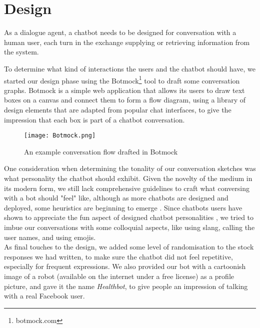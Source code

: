 \section{Design}
As a dialogue agent, a chatbot needs to be designed for conversation with a human user, each turn in the exchange supplying or retrieving information from the system.

To determine what kind of interactions the users and the chatbot should have, we started our design phase using the Botmock\footnote{botmock.com} tool to draft some conversation graphs. Botmock is a simple web application that allows its users to draw text boxes on a canvas and connect them to form a flow diagram, using a library of design elements that are adapted from popular chat interfaces, to give the impression that each box is part of a chatbot conversation.

\begin{figure}[h!]
  \texttt{[image: Botmock.png]}
  \caption{An example conversation flow drafted in Botmock}
\end{figure}
One consideration when determining the tonality of our conversation sketches was what personality the chatbot should exhibit. Given the novelty of the medium in its modern form, we still lack comprehensive guidelines to craft what conversing with a bot should "feel" like, although as more chatbots are designed and deployed, some heuristics are beginning to emerge \cite{jessie}. Since chatbots users have shown to appreciate the fun aspect of designed chatbot personalities \cite{10.1007/978-3-319-67744-6_28}, we tried to imbue our conversations with some colloquial aspects, like using slang, calling the user names, and using emojis. \\
As final touches to the design, we added some level of randomisation to the stock responses we had written, to make sure the chatbot did not feel repetitive, especially for frequent expressions. We also provided our bot with a cartoonish image of a robot (available on the internet under a free license) as a profile picture, and gave it the name \textit{Healthbot}, to give people an impression of talking with a real Facebook user.
